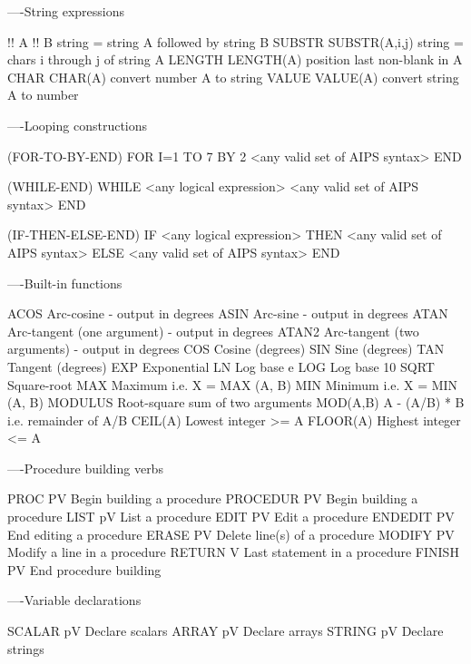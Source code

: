                    ----String expressions

  !!       A !! B        string = string A followed by string B
  SUBSTR   SUBSTR(A,i,j) string = chars i through j of string A
  LENGTH   LENGTH(A)     position last non-blank in A
  CHAR     CHAR(A)       convert number A to string
  VALUE    VALUE(A)      convert string A to number


                   ----Looping constructions

  (FOR-TO-BY-END)        FOR I=1 TO 7 BY 2
                         <any valid set of AIPS syntax>
                         END

  (WHILE-END)            WHILE <any logical expression>
                         <any valid set of AIPS syntax>
                         END

  (IF-THEN-ELSE-END)     IF <any logical expression>
                         THEN <any valid set of AIPS syntax>
                         ELSE <any valid set of AIPS syntax>
                         END

                   ----Built-in functions

  ACOS          Arc-cosine - output in degrees
  ASIN          Arc-sine - output in degrees
  ATAN          Arc-tangent (one argument) - output in degrees
  ATAN2         Arc-tangent (two arguments) - output in degrees
  COS           Cosine (degrees)
  SIN           Sine (degrees)
  TAN           Tangent (degrees)
  EXP           Exponential
  LN            Log base e
  LOG           Log base 10
  SQRT          Square-root
  MAX           Maximum i.e. X = MAX (A, B)
  MIN           Minimum i.e. X = MIN (A, B)
  MODULUS       Root-square sum of two arguments
  MOD(A,B)      A - (A/B) * B  i.e. remainder of A/B
  CEIL(A)       Lowest integer >= A
  FLOOR(A)      Highest integer <= A

                   ----Procedure building verbs

  PROC      PV  Begin building a procedure
  PROCEDUR  PV  Begin building a procedure
  LIST      pV  List a procedure
  EDIT      PV  Edit a procedure
  ENDEDIT   PV  End editing a procedure
  ERASE     PV  Delete line(s) of a procedure
  MODIFY    PV  Modify a line in a procedure
  RETURN    V   Last statement in a procedure
  FINISH    PV  End procedure building

                   ----Variable declarations

  SCALAR    pV  Declare scalars
  ARRAY     pV  Declare arrays
  STRING    pV  Declare strings

